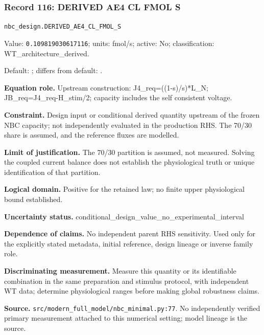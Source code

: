 \subsubsection*{Record 116: DERIVED AE4 CL FMOL S}
{\small \nolinkurl{nbc_design.DERIVED_AE4_CL_FMOL_S}\par

Value: \texttt{0.109819030617116}; units: fmol/s; active: No; classification: WT\_architecture\_derived.\par

Default: ; differs from default: .\par

\textbf{Equation role.} Upstream construction: J4\_req=((1-s)/s)*L\_N; JB\_req=J4\_req-H\_stim/2; capacity includes the self consistent voltage.\par

\textbf{Constraint.} Design input or conditional derived quantity upstream of the frozen NBC capacity; not independently evaluated in the production RHS. The 70/30 share is assumed, and the reference fluxes are modelled.\par

\textbf{Limit of justification.} The 70/30 partition is assumed, not measured. Solving the coupled current balance does not establish the physiological truth or unique identification of that partition.\par

\textbf{Logical domain.} Positive for the retained law; no finite upper physiological bound established.\par

\textbf{Uncertainty status.} conditional\_design\_value\_no\_experimental\_interval\par

\textbf{Dependence of claims.} No independent parent RHS sensitivity. Used only for the explicitly stated metadata, initial reference, design lineage or inverse family role.\par

\textbf{Discriminating measurement.} Measure this quantity or its identifiable combination in the same preparation and stimulus protocol, with independent WT data; determine physiological ranges before making global robustness claims.\par

\textbf{Source.} \nolinkurl{src/modern_full_model/nbc_minimal.py:77}. No independently verified primary measurement attached to this numerical setting; model lineage is the source.\par}

